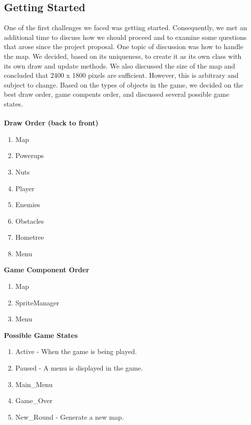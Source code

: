 \documentclass[]{article}
\begin{document}
		\subsection{Getting Started}
			One of the first challenges we faced was getting started.  Consequently, we met an additional time to discuss how we should proceed and to examine some questions that arose since the project proposal.  One topic of discussion was how to handle the map.  We decided, based on its uniqueness, to create it as its own class with its own draw and update methods.  We also discussed the size of the map and concluded that 2400 x 1800 pixels are sufficient.  However, this is arbitrary and subject to change.  Based on the types of objects in the game, we decided on the best draw order, game compents order, and discussed several possible game states.\\\\
			\textbf{Draw Order (back to front)}
			\begin{enumerate}
				\item Map
				\item Powerups
				\item Nuts
				\item Player
				\item Enemies
				\item Obstacles
				\item Hometree
				\item Menu
			\end{enumerate}
			\textbf{Game Component Order}
			\begin{enumerate}
				\item Map
				\item SpriteManager
				\item Menu
			\end{enumerate}
			\textbf{Possible Game States}
			\begin{enumerate}
				\item Active - When the game is being played.
				\item Paused - A menu is displayed in the game.
				\item Main\_Menu
				\item Game\_Over
				\item New\_Round - Generate a new map.
			\end{enumerate}
\end{document}
